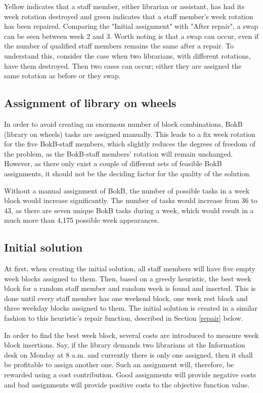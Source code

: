 Yellow indicates that a staff member, either librarian or assistant, has had its week rotation destroyed and green indicates that a staff member's week rotation has been repaired. Comparing the "Initial assignment" with "After repair", a swap can be seen between week 2 and 3. Worth noting is that a swap can occur, even if the number of qualified staff members remains the same after a repair. To understand this, consider the case when two librarians, with different rotations, have them destroyed. Then two cases can occur; either they are assigned the same rotation as before or they swap.


\subsection{Assignment of library on wheels} \label{BokB_assignment}
In order to avoid creating an enormous number of block combinations, BokB (library on wheels) tasks are assigned manually. This leads to a fix week rotation for the five BokB-staff members, which slightly reduces the degrees of freedom of the problem, as the BokB-staff members' rotation will remain unchanged. However, as there only exist a couple of different sets of feasible BokB assignments, it should not be the deciding factor for the quality of the solution.

Without a manual assignment of BokB, the number of possible tasks in a week block would increase significantly. The number of tasks would increase from 36 to 43, as there are seven unique BokB tasks during a week, which would result in a much more than 4,175 possible week appearances.

\subsection{Initial solution} \label{initial_solution}
At first, when creating the initial solution, all staff members will have five empty week blocks assigned to them. Then, based on a greedy heuristic, the best week block for a random staff member and random week is found and inserted. This is done until every staff member has one weekend block, one week rest block and three weekday blocks assigned to them. The initial solution is created in a similar fashion to this heuristic's repair function, described in Section \ref{repair} below.

In order to find the best week block, several costs are introduced to measure week block insertions. Say, if the library demands two librarians at the Information desk on Monday at 8 a.m. and currently there is only one assigned, then it shall be profitable to assign another one. Such an assignment will, therefore, be rewarded using a cost contribution. Good assignments will provide negative costs and bad assignments will provide positive costs to the objective function value.

